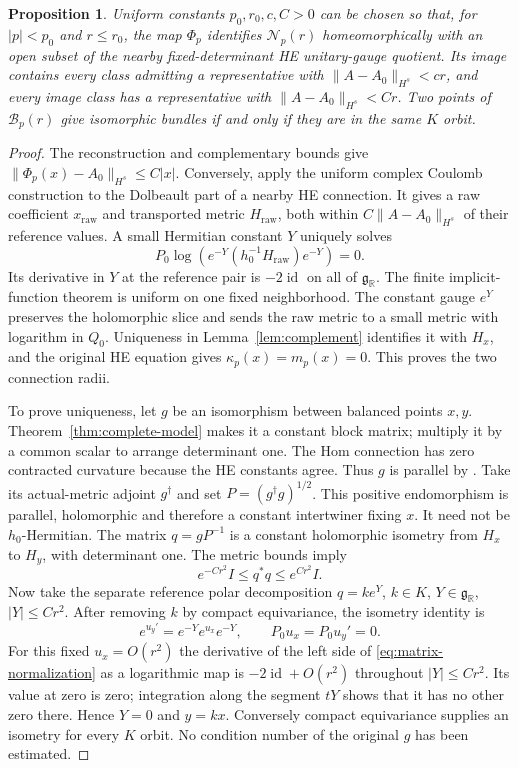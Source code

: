 \documentclass[11pt]{amsart}
\newtheorem{proposition}[theorem]{Proposition}
\theoremstyle{definition}
\theoremstyle{remark}
\newcommand{\RR}{\mathbb R}
\newcommand{\id}{\operatorname{id}}
\newcommand{\cB}{\mathcal B}
\newcommand{\cN}{\mathcal N}
\begin{document}
\begin{proposition}\label{prop:quotient-coverage}
Uniform constants $p_0,r_0,c,C>0$ can be chosen so that, for
$|p|<p_0$ and $r\le r_0$, the map $\Phi_p$ identifies $\cN_p(r)$
homeomorphically with an open subset of the nearby fixed-determinant
HE unitary-gauge quotient. Its image contains every class admitting
a representative with $\|A-A_0\|_{H^s}<cr$, and every image class
has a representative with $\|A-A_0\|_{H^s}<Cr$.
Two points of $\cB_p(r)$ give isomorphic bundles if and only if
they are in the same $K$ orbit.
\end{proposition}
\begin{proof}
The reconstruction and complementary bounds give
$\|\Phi_p(x)-A_0\|_{H^s}\le C|x|$. Conversely, apply the uniform
complex Coulomb construction to the Dolbeault part of a nearby HE
connection. It gives a raw coefficient $x_{\mathrm{raw}}$ and transported
metric $H_{\mathrm{raw}}$, both within $C\|A-A_0\|_{H^s}$ of
their reference values. A small Hermitian constant $Y$ uniquely solves
\begin{equation}\label{eq:matrix-normalization}
 P_0\log(e^{-Y}(h_0^{-1}H_{\mathrm{raw}})e^{-Y})=0.
\end{equation}
Its derivative in $Y$ at the reference pair is $-2\id$ on all of
$\mathfrak g_{\RR}$. The finite implicit-function theorem is
uniform on one fixed neighborhood. The constant gauge $e^Y$ preserves
the holomorphic slice and sends the raw metric to a small metric with
logarithm in $Q_0$. Uniqueness in Lemma~\ref{lem:complement}
identifies it with $H_x$, and the original HE equation gives
$\kappa_p(x)=m_p(x)=0$. This proves the two connection radii.

To prove uniqueness, let $g$ be an isomorphism between balanced points
$x,y$. Theorem~\ref{thm:complete-model} makes it a constant block
matrix; multiply it by a common scalar to arrange determinant one.
The Hom connection has zero contracted curvature because the HE
constants agree. Thus $g$ is parallel by
\cite[Proposition 4.1.7]{Kobayashi87}. Take its actual-metric adjoint
$g^\dagger$ and set $P=(g^\dagger g)^{1/2}$. This positive
endomorphism is parallel, holomorphic and therefore a constant
intertwiner fixing $x$. It need not be $h_0$-Hermitian. The matrix
$q=gP^{-1}$ is a constant holomorphic isometry from $H_x$ to $H_y$,
with determinant one. The metric bounds imply
\[
 e^{-Cr^2}I\le q^*q\le e^{Cr^2}I.
\]
Now take the separate reference polar decomposition $q=ke^Y$,
$k\in K$, $Y\in\mathfrak g_{\RR}$, $|Y|\le Cr^2$.
After removing $k$ by compact equivariance, the isometry identity is
\[
 e^{u_y'}=e^{-Y}e^{u_x}e^{-Y},\qquad P_0u_x=P_0u_y'=0.
\]
For this fixed $u_x=O(r^2)$ the derivative of the left side of
\eqref{eq:matrix-normalization} as a logarithmic map is
$-2\id+O(r^2)$ throughout $|Y|\le Cr^2$. Its value at zero is
zero; integration along the segment $tY$ shows that it has no other
zero there. Hence $Y=0$ and $y=kx$. Conversely compact equivariance
supplies an isometry for every $K$ orbit. No condition number of the
original $g$ has been estimated.


\end{proof}
\end{document}
